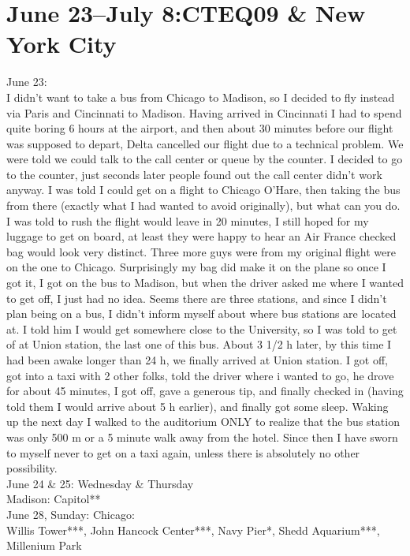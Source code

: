 \section{June 23--July 8:CTEQ09 \& New York City}
\label{2009:US}

June 23:\\
I didn't want to take a bus from Chicago to Madison, so I decided to fly instead via Paris and Cincinnati to Madison. Having arrived in Cincinnati I had to spend quite boring 6 hours at the airport, and then about 30 minutes before our flight was supposed to depart, Delta cancelled our flight due to a technical problem. We were told we could talk to the call center or queue by the counter. I decided to go to the counter, just seconds later people found out the call center didn't work anyway. I was told I could get on a flight to Chicago O'Hare, then taking the bus from there (exactly what I had wanted to avoid originally), but what can you do. I was told to rush the flight would leave in 20 minutes, I still hoped for my luggage to get on board, at least they were happy to hear an Air France checked bag would look very distinct. Three more guys were from my original flight were on the one to Chicago. Surprisingly my bag did make it on the plane so once I got it, I got on the bus to Madison, but when the driver asked me where I wanted to get off, I just had no idea. Seems there are three stations, and since I didn't plan being on a bus, I didn't inform myself about where bus stations are located at. I told him I would get somewhere close to the University, so I was told to get of at Union station, the last one of this bus. About 3 1/2 h later, by this time I had been awake longer than 24 h, we finally arrived at Union station. I got off, got into a taxi with 2 other folks, told the driver where i wanted to go, he drove for about 45 minutes, I got off, gave a generous tip, and finally checked in (having told them I would arrive about 5 h earlier), and finally got some sleep. Waking up the next day I walked to the auditorium ONLY to realize that the bus station was only 500 m or a 5 minute walk away from the hotel. Since then I have sworn to myself never to get on a taxi again, unless there is absolutely no other possibility.\\

June 24 \& 25: Wednesday \& Thursday\\
Madison: Capitol**\\

June 28, Sunday: Chicago:\\
Willis Tower***, John Hancock Center***, Navy Pier*, Shedd Aquarium***, Millenium Park\\

